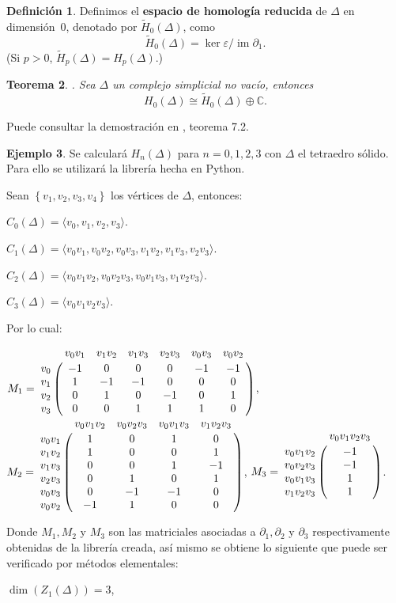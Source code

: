 \documentclass[12pt]{book}
\newtheorem{theorem}{Teorema}[section]
\theoremstyle{definition}
\newtheorem{definition}[theorem]{Definición}
\newtheorem{example}[theorem]{Ejemplo}
\newcounter{in}
\newcounter{ini}
\DeclareMathOperator{\im}{im}
\begin{document}
\begin{definition}
  Definimos el \textbf{espacio de homología reducida} de $\Delta$ en
  dimensión~$0$, denotado por $\widetilde H_{0}(\Delta)$, como
  \begin{equation*}
    \widetilde H_{0}(\Delta)=\ker\varepsilon/ \im \partial_{1}.
  \end{equation*}
  (Si $p>0$, $\widetilde H_{p}(\Delta) = H_{p}(\Delta)$.)
\end{definition}

\begin{theorem}.
  Sea $\Delta$ un complejo simplicial no vacío, entonces
  $$H_{0}(\Delta)\cong \widetilde H_{0}(\Delta)\oplus
  \mathbb{C}.$$
\end{theorem}
Puede consultar la demostración en \cite{munkres1984elements}, teorema 7.2.
\begin{example}
  Se calculará $H_{n}(\Delta)$ para $n=0, 1, 2, 3$ con $\Delta$ el
  tetraedro sólido.  Para ello se utilizará la librería hecha en Python.

  Sean $\left \{ v_1,v_2,v_3,v_4 \right \}$ los vértices de $\Delta$, entonces:
  
  $C_{0}(\Delta)=\langle v_{0},v_{1},v_{2},v_{3}\rangle.$ 
   
  $C_{1}(\Delta)=\langle v_{0}v_{1},v_{0}v_{2},v_{0}v_{3},v_{1}v_{2},v_{1}v_{3},v_{2}v_{3}\rangle.$ 
  
  $C_{2}(\Delta)=\langle v_{0}v_{1}v_{2},v_{0}v_{2}v_{3},v_{0}v_{1}v_{3},v_{1}v_{2}v_{3}\rangle.$  
  
  $C_{3}(\Delta)=\langle v_{0}v_{1}v_{2}v_{3}\rangle.$

  Por lo cual:
  \begin{center}
    $M_1 = \bordermatrix{  & v_{0}v_{1} & v_{1}v_{2} & v_{1}v_{3} & v_{2}v_{3} & v_{0}v_{3} & v_{0}v_{2} \cr
      v_{0} & -1 &  0 &  0 &  0 & -1 & -1 \cr
      v_{1} &  1 & -1 & -1 &  0 &  0 &  0 \cr
      v_{2} &  0 &  1 &  0 & -1 &  0 &  1 \cr
      v_{3} &  0 &  0 &  1 &  1 &  1 &  0 \cr
    }$, \quad
    $M_2 = \bordermatrix{  &  v_{0}v_{1}v_{2} & v_{0}v_{2}v_{3} & v_{0}v_{1}v_{3} & v_{1}v_{2}v_{3} \cr
      v_{0}v_{1}  & 1 &  0 &  1 &  0 \cr
      v_{1}v_{2}  & 1 &  0 &  0 &  1 \cr
      v_{1}v_{3}  & 0 &  0 &  1 & -1 \cr
      v_{2}v_{3}  & 0 &  1 &  0 &  1 \cr
      v_{0}v_{3}  & 0 & -1 & -1 &  0 \cr
      v_{0}v_{2}  & -1&  1 &  0 &  0 \cr
    }$, \quad
     $M_3 = \bordermatrix{  & v_{0}v_{1}v_{2}v_{3} \cr
      v_{0}v_{1}v_{2}  & -1 \cr
      v_{0}v_{2}v_{3}  & -1 \cr
      v_{0}v_{1}v_{3}  &  1 \cr
      v_{1}v_{2}v_{3}  &  1 \cr
    }$.
\end{center}
Donde $M_1, M_2$ y $ M_3$ son las matriciales asociadas a
$\partial_1, \partial_2$ y $\partial_3$ respectivamente obtenidas de
la librería creada, así mismo se obtiene lo siguiente que puede ser
verificado por métodos elementales:
\begin{center}
  $\dim(Z_{1}(\Delta)) = 3$,


\end{center}
\end{example}
\end{document}
